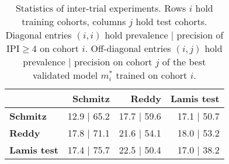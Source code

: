 \begin{table}
    \centering
    \begin{tabular}{lrrr}
        \hline
        & \textbf{Schmitz} & \textbf{Reddy} & \textbf{Lamis test} \\
        \hline
        \textbf{Schmitz} & \num{12.9} | \num{65.2} & \num{17.7} | \num{59.6} & \num{17.1} | \num{50.7} \\
        \textbf{Reddy} & \num{17.8} | \num{71.1} & \num{21.6} | \num{54.1} & \num{18.0} | \num{53.2} \\
        \textbf{Lamis test} & \num{17.4} | \num{75.7} & \num{22.5} | \num{50.4} & \num{17.0} | \num{38.2} \\
        \hline
    \end{tabular}
    \caption{Statistics of inter-trial experiments. Rows $i$ hold training cohorts, columns $j$ 
        hold test cohorts. Diagonal 
        entries $(i, i)$ hold prevalence | precision of $\text{IPI} \geq 4$
        on cohort $i$. Off-diagonal entries $(i, j)$ hold prevalence | precision 
        on cohort $j$ of the best validated model $m^*_i$ trained on cohort $i$.}
    \label{table:inter-trial}
\end{table}